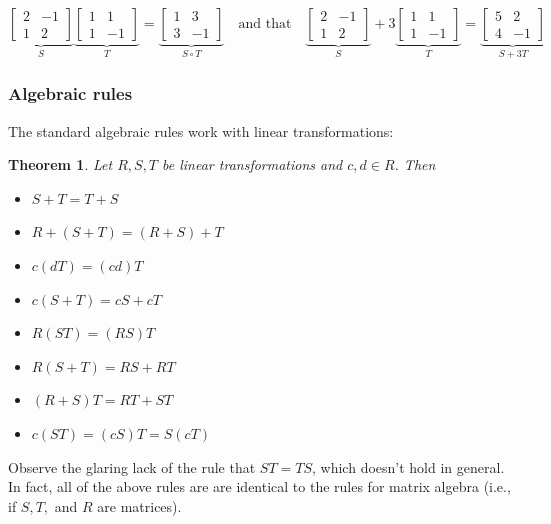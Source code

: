 \documentclass[10pt]{article}
\newtheorem{theorem}{Theorem}
\theoremstyle{definition}
\begin{document}
\begin{equation*}
  \underbrace{
    \begin{bmatrix}
    2&-1\\
    1&2
  \end{bmatrix}}_{S}
\underbrace{
  \begin{bmatrix}
    1&1\\
    1&-1
  \end{bmatrix}}_{T}
  =
  \underbrace{\begin{bmatrix}
    1&3\\
    3&-1
  \end{bmatrix}}_{S\circ T}
  \quad \text{and that} \quad 
  \underbrace{\begin{bmatrix}
    2&-1\\
    1&2
  \end{bmatrix}}_{S}
  + 3
  \underbrace{\begin{bmatrix}
    1&1\\
    1&-1
  \end{bmatrix}}_{T}
  =
  \underbrace{
    \begin{bmatrix}
    5&2\\4&-1
  \end{bmatrix}}_{S+3T}
\end{equation*}

\subsubsection{Algebraic rules}
The standard algebraic rules work with linear transformations:

\begin{theorem}
  Let $R,S,T$ be linear transformations and $c,d\in R$. Then
  \begin{itemize}
    \item $S+T=T+S$
    \item $R+(S+T)=(R+S)+T$
    \item $c(dT)=(cd)T $
    \item $c(S+T)=cS+cT$
    \item $R(ST)=(RS)T$
    \item $R(S+T)=RS+RT$
    \item $(R+S)T=RT+ST$
    \item $c(ST)=(cS)T=S(cT)$
  \end{itemize}
\end{theorem}

Observe the glaring lack of the rule that $ST=TS$, which doesn't hold in
general. In fact, all of the above rules are are identical to the rules for
matrix algebra (i.e., if $S,T,$ and $R$ are matrices).
\end{document}
